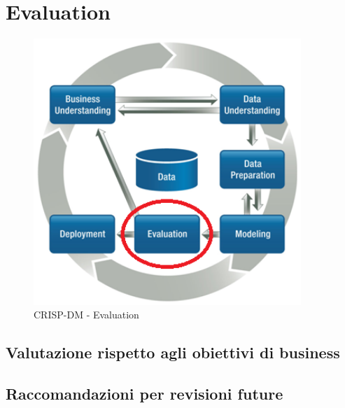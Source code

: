 \chapter{Evaluation}

\begin{figure}[hbtp]
	\centering
	\includegraphics[width=0.9\textwidth]{./images/CRISPDM_5.png}
	\caption{CRISP-DM - Evaluation}
	\label{CRISPDM_5}
\end{figure}

\section{Valutazione rispetto agli obiettivi di business}

\section{Raccomandazioni per revisioni future}
